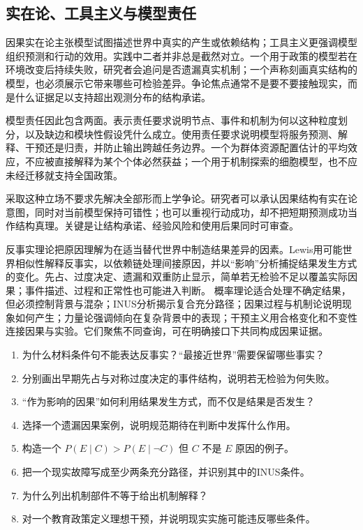 \subsection{实在论、工具主义与模型责任}

因果实在论主张模型试图描述世界中真实的产生或依赖结构；工具主义更强调模型组织预测和行动的效用。实践中二者并非总是截然对立。一个用于政策的模型若在环境改变后持续失败，研究者会追问是否遗漏真实机制；一个声称刻画真实结构的模型，也必须展示它带来哪些可检验差异。争论焦点通常不是要不要接触现实，而是什么证据足以支持超出观测分布的结构承诺。

模型责任因此包含两面。表示责任要求说明节点、事件和机制为何以这种粒度划分，以及缺边和模块性假设凭什么成立。使用责任要求说明模型将服务预测、解释、干预还是归责，并防止输出跨越任务边界。一个为群体资源配置估计的平均效应，不应被直接解释为某个个体必然获益；一个用于机制探索的细胞模型，也不应未经迁移就支持全国政策。

采取这种立场不要求先解决全部形而上学争论。研究者可以承认因果结构有实在论意图，同时对当前模型保持可错性；也可以重视行动成功，却不把短期预测成功当作结构真理。关键是让结构承诺、经验风险和使用后果同时可审查。

\begin{chapterreview}
反事实理论把原因理解为在适当替代世界中制造结果差异的因素。Lewis用可能世界相似性解释反事实，以依赖链处理间接原因，并以“影响”分析捕捉结果发生方式的变化。先占、过度决定、遗漏和双重防止显示，简单若无检验不足以覆盖实际因果；事件描述、过程和正常性也可能进入判断。 概率理论适合处理不确定结果，但必须控制背景与混杂；INUS分析揭示复合充分路径；因果过程与机制论说明现象如何产生；力量论强调倾向在复杂背景中的表现；干预主义用合格变化和不变性连接因果与实验。它们聚焦不同查询，可在明确接口下共同构成因果证据。
\end{chapterreview}

\begin{selfcheck}
\begin{enumerate}
  \item 为什么材料条件句不能表达反事实？“最接近世界”需要保留哪些事实？
  \item 分别画出早期先占与对称过度决定的事件结构，说明若无检验为何失败。
  \item “作为影响的因果”如何利用结果发生方式，而不仅是结果是否发生？
  \item 选择一个遗漏因果案例，说明规范期待在判断中发挥什么作用。
  \item 构造一个 $P(E\mid C)>P(E\mid\neg C)$ 但 $C$ 不是 $E$ 原因的例子。
  \item 把一个现实故障写成至少两条充分路径，并识别其中的INUS条件。
  \item 为什么列出机制部件不等于给出机制解释？
  \item 对一个教育政策定义理想干预，并说明现实实施可能违反哪些条件。
\end{enumerate}
\end{selfcheck}

